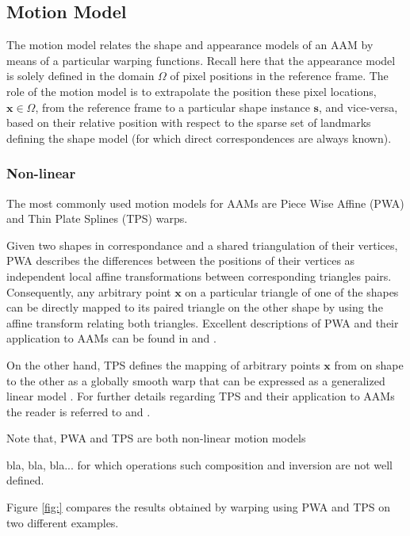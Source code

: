 \subsection{Motion Model}
\label{sec:motion}

The motion model relates the shape and appearance models of an AAM by means of a particular warping functions. Recall here that the appearance model is solely defined in the
domain $\Omega$ of pixel positions in the reference frame. The role of the motion model is to extrapolate the position these pixel locations, $\mathbf{x} \in \Omega$, from the reference frame to a particular shape instance $\mathbf{s}$, and vice-versa, based on their relative position with respect to the sparse set of landmarks defining the shape model (for which direct correspondences are always known).

\subsubsection{Non-linear}

The most commonly used motion models for AAMs are Piece Wise Affine (PWA) \cite{Cootes2004,Matthews2004} and Thin Plate Splines (TPS) \cite{Cootes2004,Papandreou2008} warps.

Given two shapes in correspondance and a shared triangulation of their vertices, PWA describes the differences between the positions of their vertices as independent local affine transformations between corresponding triangles pairs. Consequently, any arbitrary point $\mathbf{x}$ on a particular triangle of one of the shapes can be directly mapped to its paired triangle on the other shape by using the affine transform relating both triangles. Excellent descriptions of PWA and their application to AAMs can be found in \cite{Cootes2004} and \cite{Matthews2004}.

On the other hand, TPS defines the mapping of arbitrary points $\mathbf{x}$ from on shape to the other as a globally smooth warp that can be expressed as a generalized linear model \cite{Bookstein1989}. For further details regarding TPS and their application to AAMs the reader is referred to \cite{Cootes2004} and \cite{Papandreou2008}.

Note that, PWA and TPS are both non-linear motion models 

bla, bla, bla... for which operations such composition and inversion are not well defined.


Figure \ref{fig:} compares the results obtained by warping using PWA and TPS on two different examples.

